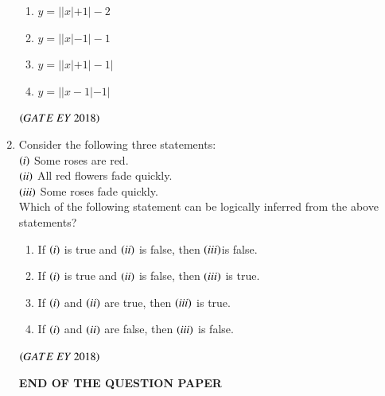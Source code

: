 \documentclass[journal]{IEEEtran}
\numberwithin{equation}{enumi}
\numberwithin{figure}{enumi}
\begin{document}
\begin{enumerate}
\begin{multicols}{2}
\begin{enumerate}
    \item $y = ||x|+1|-2$ 
    \item $y = ||x|-1|-1$
    \item $y = ||x|+1|-1|$
    \item $y = ||x-1|-1|$
\end{enumerate}
\end{multicols}
\hfill{$\brak{ GATE\ EY\ 2018}$}
\bigskip
\item Consider the following three statements:\\$\left(i\right)$ Some roses are red.\\$\left(ii\right)$ All red flowers fade quickly.\\$\left(iii\right)$ Some roses fade quickly.\\Which of the following statement can be logically inferred from the above statements?
\begin{enumerate}
    \item If $\left(i\right)$ is true and $\left(ii\right)$ is false, then $\left(iii\right)$is false.
    \item If $\left(i\right)$ is true and $\left(ii\right)$ is false, then $\left(iii\right)$ is true.
    \item If $\left(i\right)$ and $\left(ii\right)$ are true, then $\left(iii\right)$ is true.
    \item If $\left(i\right)$ and $\left(ii\right)$ are false, then $\left(iii\right)$ is false.
\end{enumerate}
\hfill{$\brak{ GATE\ EY\ 2018}$}
\begin{center}
\Large
\textbf{END OF THE QUESTION PAPER}
\end{center}
\end{enumerate}
\end{document}
